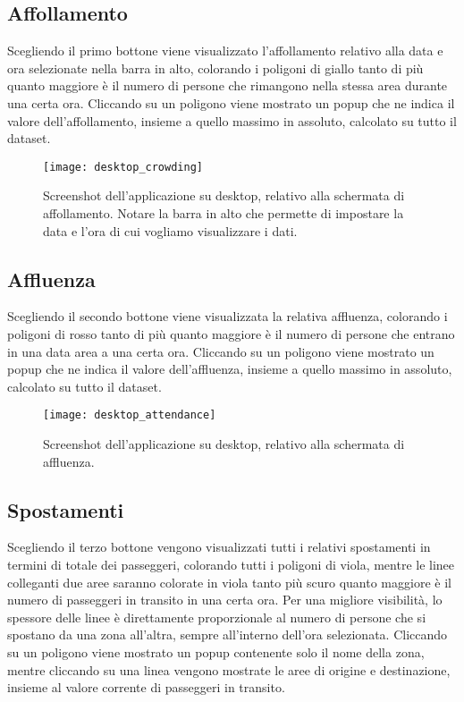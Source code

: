 \subsection{Affollamento}
Scegliendo il primo bottone viene visualizzato l'affollamento relativo alla data e ora selezionate nella barra in alto, colorando i poligoni di giallo tanto di più quanto maggiore è il numero di persone che rimangono nella stessa area durante una certa ora. Cliccando su un poligono viene mostrato un popup che ne indica il valore dell'affollamento, insieme a quello massimo in assoluto, calcolato su tutto il dataset.

\begin{figure}[H]
    \centering
    \texttt{[image: desktop\_crowding]}
    \caption[Screenshot dell'affollamento su desktop]{Screenshot dell'applicazione su desktop, relativo alla schermata di affollamento. Notare la barra in alto che permette di impostare la data e l'ora di cui vogliamo visualizzare i dati.}
    \label{fig:desktop_crowding}
\end{figure}

\subsection{Affluenza}
Scegliendo il secondo bottone viene visualizzata la relativa affluenza, colorando i poligoni di rosso tanto di più quanto maggiore è il numero di persone che entrano in una data area a una certa ora. Cliccando su un poligono viene mostrato un popup che ne indica il valore dell'affluenza, insieme a quello massimo in assoluto, calcolato su tutto il dataset.

\begin{figure}[H]
    \centering
    \texttt{[image: desktop\_attendance]}
    \caption[Screenshot dell'affluenza su desktop]{Screenshot dell'applicazione su desktop, relativo alla schermata di affluenza.}
    \label{fig:desktop_attendance}
\end{figure}

\subsection{Spostamenti}
Scegliendo il terzo bottone vengono visualizzati tutti i relativi spostamenti in termini di totale dei passeggeri, colorando tutti i poligoni di viola, mentre le linee colleganti due aree saranno colorate in viola tanto più scuro quanto maggiore è il numero di passeggeri in transito in una certa ora. Per una migliore visibilità, lo spessore delle linee è direttamente proporzionale al numero di persone che si spostano da una zona all'altra, sempre all'interno dell'ora selezionata. Cliccando su un poligono viene mostrato un popup contenente solo il nome della zona, mentre cliccando su una linea vengono mostrate le aree di origine e destinazione, insieme al valore corrente di passeggeri in transito.

